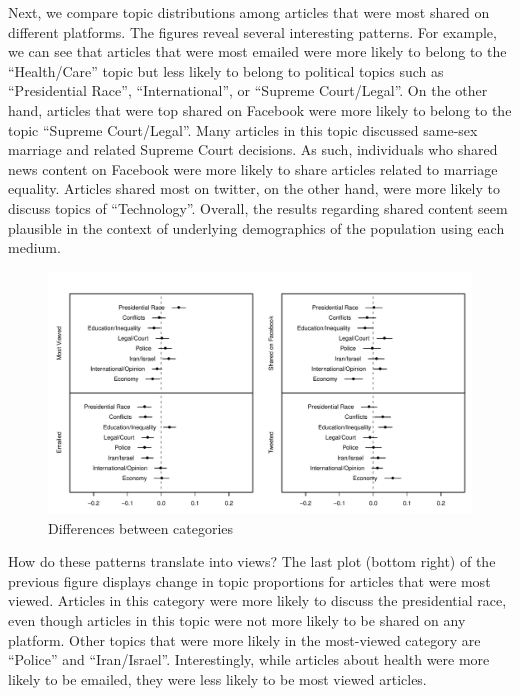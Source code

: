 \documentclass[12pt]{article}
\begin{document}
\begin{doublespace}
Next, we compare topic distributions among articles that were most shared on different platforms. The figures reveal several interesting patterns. For example, we can see that articles that were most emailed were more likely to belong to the ``Health/Care'' topic but less likely to belong to political topics such as ``Presidential Race'', ``International'', or ``Supreme Court/Legal''. On the other hand, articles that were top shared on Facebook were more likely to belong to the topic ``Supreme Court/Legal''. Many articles in this topic discussed same-sex marriage and related Supreme Court decisions. As such, individuals who shared news content on Facebook were more likely to share articles related to marriage equality. Articles shared most on twitter, on the other hand, were more likely to discuss topics of ``Technology''. Overall, the results regarding shared content seem plausible in the context of underlying demographics of the population using each medium.

\begin{figure}
\caption{Differences between categories}\label{fig:res_share_polecon}
\includegraphics[width=\textwidth]{../calc/fig/res_share_polecon} 
\end{figure}

How do these patterns translate into views? The last plot (bottom right) of the previous figure displays change in topic proportions for articles that were most viewed. Articles in this category were more likely to discuss the presidential race, even though articles in this topic were not more likely to be shared on any platform. Other topics that were more likely in the most-viewed category are ``Police'' and ``Iran/Israel''. Interestingly, while articles about health were more likely to be emailed, they were less likely to be most viewed articles.



\end{doublespace}
\end{document}
